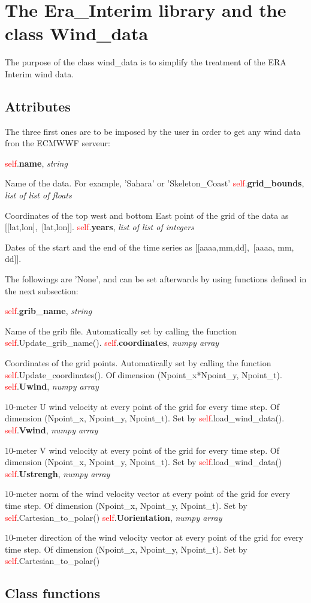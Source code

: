 \documentclass[12pt]{article}
\newcommand{\Attribute}[3]{\filbreak\noindent
\qquad \textbullet \quad \textcolor{red}{self}.\textbf{#1}, \textit{{#2}}

{#3}
\vspace*{0.4 cm}}
\begin{document}
\section{The Era\_Interim library and the class Wind\_data}
The purpose of the class wind\_data is to simplify the treatment of the ERA Interim wind data.

\subsection{Attributes}
The three first ones are to be imposed by the user in order to get any wind data fron the ECMWWF serveur:

\Attribute{name}{string}{Name of the data. For example, 'Sahara' or 'Skeleton\_Coast'}
\Attribute{grid\_bounds}{list of list of floats}{Coordinates of the top west and bottom East point of the grid of the data as [[lat,lon],~[lat,lon]].}
\Attribute{years}{list of list of integers}{Dates of the start and the end of the time series as [[aaaa,mm,dd],~[aaaa, mm, dd]].}

The followings are 'None', and can be set afterwards by using functions defined in the next subsection:

\Attribute{grib\_name}{string}{Name of the grib file. Automatically set by calling the function \textcolor{red}{self}.Update\_grib\_name().}
\Attribute{coordinates}{numpy array}{Coordinates of the grid points. Automatically set by calling the function \textcolor{red}{self}.Update\_coordinates(). Of dimension (Npoint\_x*Npoint\_y, Npoint\_t).}
\Attribute{Uwind}{numpy array}{$10$-meter U wind velocity at every point of the grid for every time step. Of dimension (Npoint\_x, Npoint\_y, Npoint\_t). Set by \textcolor{red}{self}.load\_wind\_data().}
\Attribute{Vwind}{numpy array}{$10$-meter V wind velocity at every point of the grid for every time step. Of dimension (Npoint\_x, Npoint\_y, Npoint\_t). Set by \textcolor{red}{self}.load\_wind\_data()}
\Attribute{Ustrengh}{numpy array}{$10$-meter norm of the wind velocity vector at every point of the grid for every time step. Of dimension (Npoint\_x, Npoint\_y, Npoint\_t). Set by \textcolor{red}{self}.Cartesian\_to\_polar()}
\Attribute{Uorientation}{numpy array}{$10$-meter direction of the wind velocity vector at every point of the grid for every time step. Of dimension (Npoint\_x, Npoint\_y, Npoint\_t). Set by \textcolor{red}{self}.Cartesian\_to\_polar()}

\subsection{Class functions}
\end{document}
